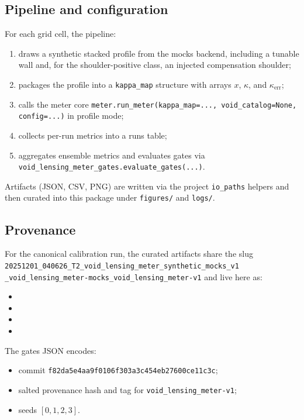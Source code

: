 \documentclass{article}
\begin{document}
\subsection*{Pipeline and configuration}
For each grid cell, the pipeline:

\begin{enumerate}
  \item draws a synthetic stacked profile from the mocks backend,
    including a tunable wall and, for the shoulder-positive class,
    an injected compensation shoulder;
  \item packages the profile into a \texttt{kappa\_map} structure with
    arrays $x$, $\kappa$, and $\kappa_{\text{err}}$;
  \item calls the meter core
    \texttt{meter.run\_meter(kappa\_map=..., void\_catalog=None, config=...)}
    in profile mode;
  \item collects per-run metrics into a runs table;
  \item aggregates ensemble metrics and evaluates gates via
    \texttt{void\_lensing\_meter\_gates.evaluate\_gates(...)}.
\end{enumerate}

Artifacts (JSON, CSV, PNG) are written via the project
\texttt{io\_paths} helpers and then curated into this package under
\texttt{figures/} and \texttt{logs/}.

\subsection*{Provenance}
For the canonical calibration run, the curated artifacts share the slug
\texttt{20251201\_040626\_T2\_void\_lensing\_meter\_synthetic\_mocks\_v1}\\
\texttt{\_void\_lensing\_meter-mocks\_void\_lensing\_meter-v1}
and live here as:
\begin{itemize}
  \item {}
  \item {}
  \item {}
  \item {}
\end{itemize}
The gates JSON encodes:
\begin{itemize}
  \item commit \texttt{f82da5e4aa9f0106f303a3c454eb27600ce11c3c};
  \item salted provenance hash and tag for \texttt{void\_lensing\_meter-v1};
  \item seeds $[0,1,2,3]$.
\end{itemize}
\end{document}
